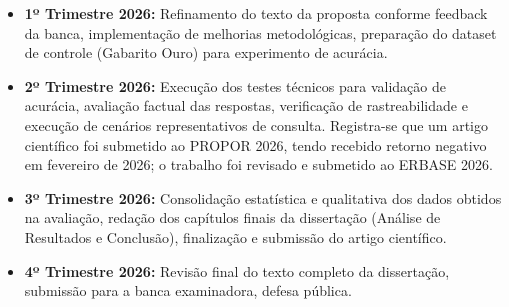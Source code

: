 \begin{itemize}
    \item \textbf{1º Trimestre 2026:} Refinamento do texto da proposta conforme feedback da banca, implementação de melhorias metodológicas, preparação do dataset de controle (Gabarito Ouro) para experimento de acurácia.

    \item \textbf{2º Trimestre 2026:} Execução dos testes técnicos para validação de acurácia, avaliação factual das respostas, verificação de rastreabilidade e execução de cenários representativos de consulta. Registra-se que um artigo científico foi submetido ao PROPOR 2026, tendo recebido retorno negativo em fevereiro de 2026; o trabalho foi revisado e submetido ao ERBASE 2026.

    \item \textbf{3º Trimestre 2026:} Consolidação estatística e qualitativa dos dados obtidos na avaliação, redação dos capítulos finais da dissertação (Análise de Resultados e Conclusão), finalização e submissão do artigo científico.

    \item \textbf{4º Trimestre 2026:} Revisão final do texto completo da dissertação, submissão para a banca examinadora, defesa pública.
\end{itemize}
